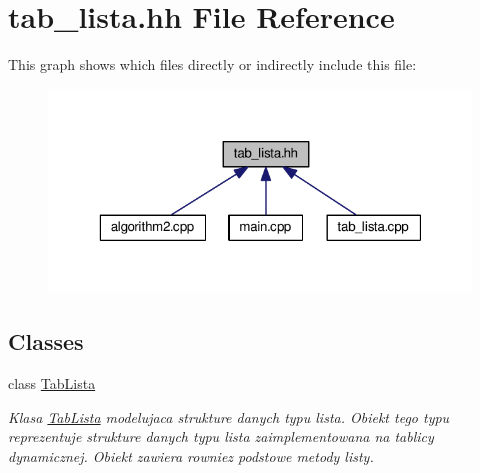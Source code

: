 \hypertarget{tab__lista_8hh}{\section{tab\-\_\-lista.\-hh File Reference}
\label{tab__lista_8hh}
}
This graph shows which files directly or indirectly include this file\-:\nopagebreak
\begin{figure}[H]
\begin{center}
\leavevmode
\includegraphics[width=323pt]{tab__lista_8hh__dep__incl}
\end{center}
\end{figure}
\subsection*{Classes}
\begin{DoxyCompactItemize}
\item 
class \hyperlink{class_tab_lista}{Tab\-Lista}
\begin{DoxyCompactList}\small\item\em Klasa \hyperlink{class_tab_lista}{Tab\-Lista} modelujaca strukture danych typu lista. Obiekt tego typu reprezentuje strukture danych typu lista zaimplementowana na tablicy dynamicznej. Obiekt zawiera rowniez podstowe metody listy. \end{DoxyCompactList}\end{DoxyCompactItemize}
